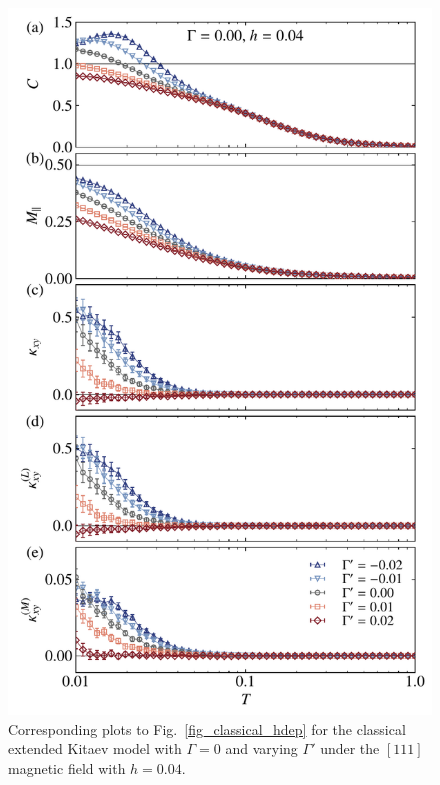 \documentclass[twocolumn,superscriptaddress,showpacs, longbibliography, aps, prx]{revtex4-2}
\begin{document}
\begin{figure}[tbh] 
\begin{center} 
\includegraphics[width=\linewidth]{Data_for_figs/plot/fig-14-classical-gammap_dep.pdf}
\vspace{-0.5cm} 
\caption{Corresponding plots to Fig.~\ref{fig_classical_hdep} for the classical extended Kitaev model with $\Gamma=0$ and varying $\Gamma'$ under the $[111]$ magnetic field with $h=0.04$.
}
\label{fig_classical_gpdep004}
\end{center}
\end{figure}
\end{document}
